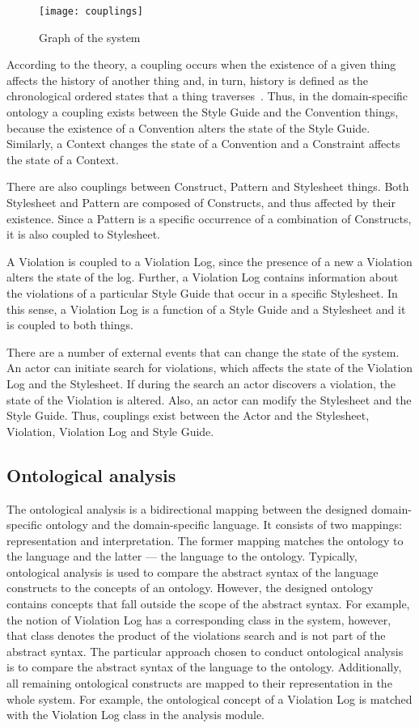\begin{figure}[h]
  \centering
  \caption{Graph of the system}
  \label{fig:couplings}
  \texttt{[image: couplings]}
\end{figure}

According to the theory, a coupling occurs when the existence of a given thing affects the history
of another thing and, in turn, history is defined as the chronological ordered states that a thing
traverses~\cite{wand1990ontological}. Thus, in the domain-specific ontology a coupling exists
between the Style Guide and the Convention things, because the existence of a Convention alters the
state of the Style Guide. Similarly, a Context changes the state of a Convention and a Constraint
affects the state of a Context.

There are also couplings between Construct, Pattern and Stylesheet things. Both Stylesheet and
Pattern are composed of Constructs, and thus affected by their existence. Since a Pattern is a
specific occurrence of a combination of Constructs, it is also coupled to Stylesheet.

A Violation is coupled to a Violation Log, since the presence of a new a Violation alters the state
of the log. Further, a Violation Log contains information about the violations of a particular Style
Guide that occur in a specific Stylesheet. In this sense, a Violation Log is a function of a Style
Guide and a Stylesheet and it is coupled to both things.

There are a number of external events that can change the state of the system. An actor can initiate
search for violations, which affects the state of the Violation Log and the Stylesheet. If during
the search an actor discovers a violation, the state of the Violation is altered. Also, an actor can
modify the Stylesheet and the Style Guide. Thus, couplings exist between the Actor and the
Stylesheet, Violation, Violation Log and Style Guide.

\subsection{Ontological analysis}

The ontological analysis is a bidirectional mapping between the designed domain-specific ontology and the
domain-specific language. It consists of two mappings: representation and interpretation. The former
mapping matches the ontology to the language and the latter --- the language to the ontology.
Typically, ontological analysis is used to compare the abstract syntax of the language constructs to
the concepts of an ontology. However, the designed ontology contains concepts that fall outside the
scope of the abstract syntax. For example, the notion of Violation Log has a corresponding class in
the system, however, that class denotes the product of the violations search and is not part of the
abstract syntax. The particular approach chosen to conduct ontological analysis is to compare the
abstract syntax of the language to the ontology. Additionally, all remaining ontological constructs
are mapped to their representation in the whole system. For example, the ontological concept of a
Violation Log is matched with the Violation Log class in the analysis module.

